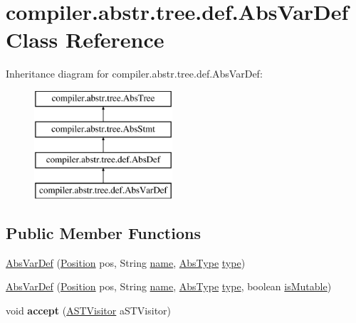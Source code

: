\hypertarget{classcompiler_1_1abstr_1_1tree_1_1def_1_1_abs_var_def}{}\section{compiler.\+abstr.\+tree.\+def.\+Abs\+Var\+Def Class Reference}
\label{classcompiler_1_1abstr_1_1tree_1_1def_1_1_abs_var_def}
Inheritance diagram for compiler.\+abstr.\+tree.\+def.\+Abs\+Var\+Def\+:\begin{figure}[H]
\begin{center}
\leavevmode
\includegraphics[height=4.000000cm]{classcompiler_1_1abstr_1_1tree_1_1def_1_1_abs_var_def}
\end{center}
\end{figure}
\subsection*{Public Member Functions}
\begin{DoxyCompactItemize}
\item 
\hyperlink{classcompiler_1_1abstr_1_1tree_1_1def_1_1_abs_var_def_afc75c5718c892329c36f593e66df597c}{Abs\+Var\+Def} (\hyperlink{classcompiler_1_1_position}{Position} pos, String \hyperlink{classcompiler_1_1abstr_1_1tree_1_1def_1_1_abs_def_ac6bda9377f5abbb5f1be7d3d1b16481b}{name}, \hyperlink{classcompiler_1_1abstr_1_1tree_1_1type_1_1_abs_type}{Abs\+Type} \hyperlink{classcompiler_1_1abstr_1_1tree_1_1def_1_1_abs_var_def_ad554fe8a1dc94c3adbabe9382f8b048b}{type})
\item 
\hyperlink{classcompiler_1_1abstr_1_1tree_1_1def_1_1_abs_var_def_a7bc7ff79638eab9f154169a525b4b4f9}{Abs\+Var\+Def} (\hyperlink{classcompiler_1_1_position}{Position} pos, String \hyperlink{classcompiler_1_1abstr_1_1tree_1_1def_1_1_abs_def_ac6bda9377f5abbb5f1be7d3d1b16481b}{name}, \hyperlink{classcompiler_1_1abstr_1_1tree_1_1type_1_1_abs_type}{Abs\+Type} \hyperlink{classcompiler_1_1abstr_1_1tree_1_1def_1_1_abs_var_def_ad554fe8a1dc94c3adbabe9382f8b048b}{type}, boolean \hyperlink{classcompiler_1_1abstr_1_1tree_1_1def_1_1_abs_def_adf1015b5167218d03ec28a486fcf4b66}{is\+Mutable})
\item 
\mbox{\label{classcompiler_1_1abstr_1_1tree_1_1def_1_1_abs_var_def_a701709489ae61fc9d334f599f09267c0}} 
void {\bfseries accept} (\hyperlink{interfacecompiler_1_1abstr_1_1_a_s_t_visitor}{A\+S\+T\+Visitor} a\+S\+T\+Visitor)
\end{DoxyCompactItemize}
